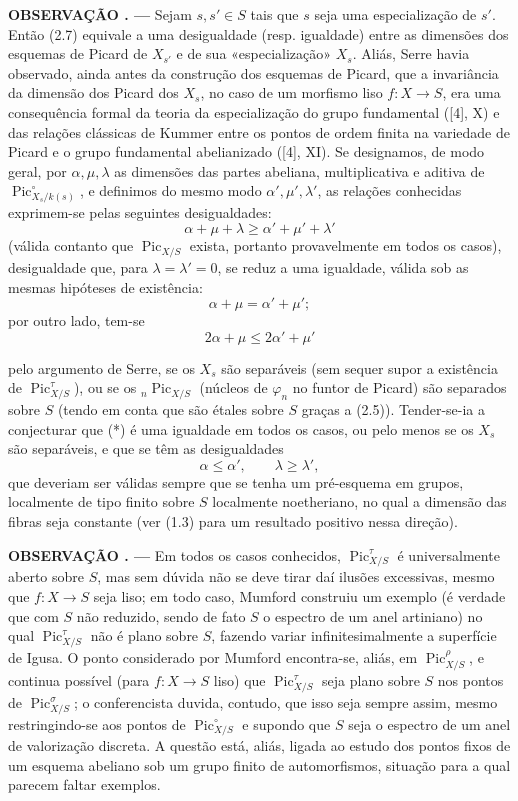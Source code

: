 \documentclass[11pt,twoside,openany]{book}
\numberwithin{equation}{section}
\newcommand{\src}[1]{%
  \phantomsection\hypertarget{src:#1}{}%
  \marginpar{\raggedleft\footnotesize\sffamily #1}%
}
\theoremstyle{plain}
\theoremstyle{definition}
\theoremstyle{remark}
\newcommand{\result}[2]{%
  \par\medskip\noindent\textbf{#1%
  \if\relax\detokenize{#2}\relax\else\space#2\fi. ---}\enspace
}
\newcommand{\FgaUnitKey}{frontmatter}
\renewcommand{\src}[1]{%
  \phantomsection\hypertarget{src:\FgaUnitKey:#1}{}%
  \marginpar{\raggedleft\footnotesize\sffamily #1}%
}
\begin{document}
\result{OBSERVAÇÃO}{2.8} Sejam $s,s'\in S$ tais que $s$ seja uma especialização
de $s'$. Então (2.7) equivale a uma desigualdade (resp. igualdade) entre as
dimensões dos esquemas de Picard de $X_{s'}$ e de sua «especialização» $X_s$.
Aliás, Serre havia observado, ainda antes da construção dos esquemas de Picard,
que a invariância da dimensão dos Picard dos $X_s$, no caso de um morfismo liso
$f:X\longrightarrow S$, era uma consequência formal da teoria da
especialização do grupo fundamental ([4], X) e das relações clássicas de Kummer
entre os pontos de ordem finita na variedade de Picard e o grupo fundamental
abelianizado ([4], XI). Se designamos, de modo geral, por $\alpha,\mu,\lambda$
as dimensões das partes abeliana, multiplicativa e aditiva de
$\operatorname{Pic}_{X_s/k(s)}^\circ$, e definimos do mesmo modo
$\alpha',\mu',\lambda'$, as relações conhecidas exprimem-se pelas seguintes
desigualdades:
\[
\tag{*}\alpha+\mu+\lambda\geq\alpha'+\mu'+\lambda'
\]
(válida contanto que $\operatorname{Pic}_{X/S}$ exista, portanto provavelmente
em todos os casos), desigualdade que, para $\lambda=\lambda'=0$, se reduz a uma
igualdade, válida sob as mesmas hipóteses de existência:
\[
\alpha+\mu=\alpha'+\mu' ;
\]
por outro lado, tem-se
\[
\tag{**}2\alpha+\mu\leq2\alpha'+\mu'
\]
\src{235}
pelo argumento de Serre, se os $X_s$ são separáveis (sem sequer supor a
existência de $\operatorname{Pic}_{X/S}^\tau$), ou se os
${}_n\operatorname{Pic}_{X/S}$ (núcleos de $\varphi_n$ no funtor de Picard) são
separados sobre $S$ (tendo em conta que são étales sobre $S$ graças a (2.5)).
Tender-se-ia a conjecturar que (*) é uma igualdade em todos os casos, ou pelo
menos se os $X_s$ são separáveis, e que se têm as desigualdades
\[
\tag{***}\alpha\leq\alpha',\qquad\lambda\geq\lambda',
\]
que deveriam ser válidas sempre que se tenha um pré-esquema em grupos,
localmente de tipo finito sobre $S$ localmente noetheriano, no qual a dimensão
das fibras seja constante (ver (1.3) para um resultado positivo nessa direção).

\result{OBSERVAÇÃO}{2.9} Em todos os casos conhecidos,
$\operatorname{Pic}_{X/S}^\tau$ é universalmente aberto sobre $S$, mas sem
dúvida não se deve tirar daí ilusões excessivas, mesmo que
$f:X\longrightarrow S$ seja liso; em todo caso, Mumford
construiu um exemplo (é verdade que com $S$ não reduzido, sendo de fato $S$ o
espectro de um anel artiniano) no qual $\operatorname{Pic}_{X/S}^\tau$ não é
plano sobre $S$, fazendo variar infinitesimalmente a superfície de Igusa. O
ponto considerado por Mumford encontra-se, aliás, em
$\operatorname{Pic}_{X/S}^\rho$, e continua possível (para
$f:X\longrightarrow S$ liso) que $\operatorname{Pic}_{X/S}^\tau$ seja plano
sobre $S$ nos pontos de $\operatorname{Pic}_{X/S}^\sigma$; o conferencista
duvida, contudo, que isso seja sempre assim, mesmo restringindo-se aos pontos de
$\operatorname{Pic}_{X/S}^\circ$ e supondo que $S$ seja o espectro de um anel
de valorização discreta. A questão está, aliás, ligada ao estudo dos pontos
fixos de um esquema abeliano sob um grupo finito de automorfismos, situação
para a qual parecem faltar exemplos.
\end{document}
